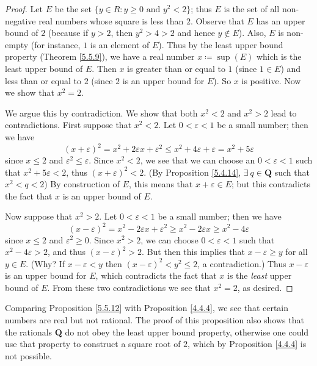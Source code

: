 \begin{proof}
Let \(E\) be the set \(\{y \in R : y \geq 0 \text{ and } y^2 < 2\}\);
thus \(E\) is the set of all non-negative real numbers whose square is less than \(2\).
Observe that \(E\) has an upper bound of \(2\) (because if \(y > 2\), then \(y^2 > 4 > 2\) and hence \(y \notin E\)).
Also, \(E\) is non-empty (for instance, \(1\) is an element of \(E\)).
Thus by the least upper bound property (Theorem \ref{5.5.9}), we have a real number \(x \coloneqq \sup(E)\) which is the least upper bound of \(E\).
Then \(x\) is greater than or equal to \(1\) (since \(1 \in E\)) and less than or equal to \(2\)
(since \(2\) is an upper bound for \(E\)).
So \(x\) is positive.
Now we show that \(x^2 = 2\).

We argue this by contradiction.
We show that both \(x^2 < 2\) and \(x^2 > 2\) lead to contradictions.
First suppose that \(x^2 < 2\).
Let \(0 < \varepsilon < 1\) be a small number;
then we have
\[
    (x + \varepsilon)^2 = x^2 + 2\varepsilon x + \varepsilon^2 \leq x^2 + 4\varepsilon + \varepsilon = x^2 + 5\varepsilon
\]
since \(x \leq 2\) and \(\varepsilon^2 \leq \varepsilon\).
Since \(x^2 < 2\), we see that we can choose an \(0 < \varepsilon < 1\) such that \(x^2 + 5\varepsilon < 2\), thus \((x + \varepsilon)^2 < 2\).
(By Proposition \ref{5.4.14}, \(\exists\ q \in \mathbf{Q}\) such that \(x^2 < q < 2\))
By construction of \(E\), this means that \(x + \varepsilon \in E\);
but this contradicts the fact that \(x\) is an upper bound of \(E\).

Now suppose that \(x^2 > 2\).
Let \(0 < \varepsilon < 1\) be a small number;
then we have
\[
    (x - \varepsilon)^2 = x^2 - 2\varepsilon x + \varepsilon^2 \geq x^2 - 2\varepsilon x \geq x^2 - 4\varepsilon
\]
since \(x \leq 2\) and \(\varepsilon^2 \geq 0\).
Since \(x^2 > 2\), we can choose \(0 < \varepsilon < 1\) such that \(x^2 - 4\varepsilon > 2\), and thus \((x - \varepsilon)^2 > 2\).
But then this implies that \(x - \varepsilon \geq y\) for all \(y \in E\).
(Why? If \(x - \varepsilon < y\) then \((x - \varepsilon)^2 < y^2 \leq 2\), a contradiction.)
Thus \(x - \varepsilon\) is an upper bound for \(E\), which contradicts the fact that \(x\) is the \emph{least} upper bound of \(E\).
From these two contradictions we see that \(x^2 = 2\), as desired.
\end{proof}

\begin{remark}\label{5.5.13}
Comparing Proposition \ref{5.5.12} with Proposition \ref{4.4.4}, we see that certain numbers are real but not rational.
The proof of this proposition also shows that the rationals \(\mathbf{Q}\) do not obey the least upper bound property, otherwise one could use that property to construct a square root of \(2\), which by Proposition \ref{4.4.4} is not possible.
\end{remark}

